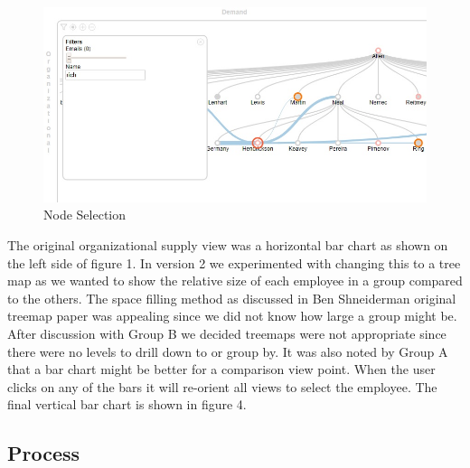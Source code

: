 \documentclass[journal]{vgtc}                %
\begin{document}
\begin{figure}
	\centering
	\includegraphics[width=\columnwidth]{pictures/orgdemand.jpg}
	\caption{Node Selection}
	\label{fig:global}
\end{figure}

The original organizational supply view was a horizontal bar chart as shown on the left side of figure 1.  In version 2 we experimented with changing this to a tree map as we wanted to show the relative size of each employee in a group compared to the others.  The space filling method\cite{shneiderman1992tree} as discussed in Ben Shneiderman original treemap paper was appealing since we did not know how large a group might be.  After discussion with Group B we decided treemaps were not appropriate since there were no levels to drill down to or group by.  It was also noted by Group A that a bar chart might be better for a comparison view point.  When the user clicks on any of the bars it will re-orient all views to select the employee.  The final vertical bar chart is shown in figure 4.



\subsection{Process}
\end{document}
